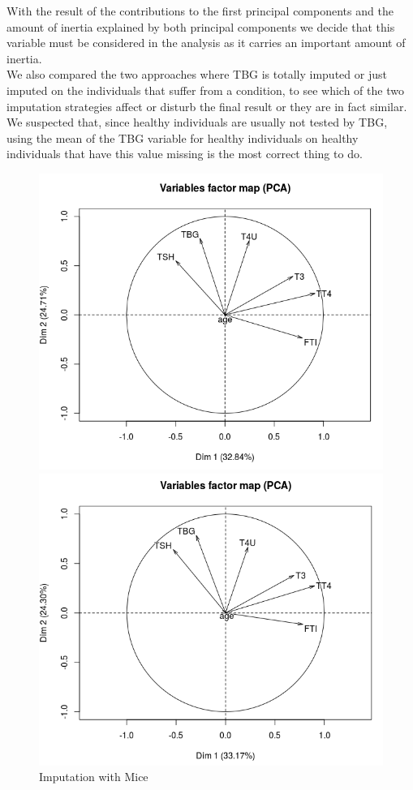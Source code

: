 \documentclass{article}
\begin{document}
With the result of the contributions to the first principal components and the amount of inertia explained by both principal components we decide that this variable must be considered in the analysis as it carries an important amount of inertia.\\
We also compared the two approaches where TBG is totally imputed or just imputed on the individuals that suffer from a condition, to see which of the two imputation strategies affect or disturb the final result or they are in fact similar. We suspected that, since healthy individuals are usually not tested by TBG, using the mean of the TBG variable for healthy individuals on healthy individuals that have this value missing is the most correct thing to do. 
\begin{figure}[H]
%
  \centering
  \includegraphics[width=\linewidth]{img/Missing_all_1f.png}
  \caption{Imputation with Mice}\label{missing_contrib1}
\endminipage\hfill
{}%
  \centering
  \includegraphics[width=\linewidth]{img/MIssing_imputecond1_1f.png}

\end{figure}
\end{document}

